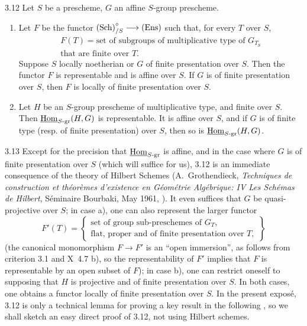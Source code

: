 \begin{proposition}{3.12}\label{XI.3.12}
Let $S$ be a prescheme, $G$ an affine $S$-group prescheme.
\begin{enumerate}[label=\alph*)]
\item Let $F$ be the functor $\textup{(Sch)}^\circ_{/S}\longrightarrow\textup{(Ens)}$ such that, for every $T$ over $S$,
\[
\begin{split}
F(T)=\text{set of subgroups of multiplicative type of }G_{T_S}\\
\text{that are finite over }T.
\end{split}
\]
Suppose $S$ locally noetherian or $G$ of finite presentation over $S$. Then the functor $F$ is representable and is affine over $S$. If $G$ is of finite presentation over $S$, then $F$ is locally of finite presentation over $S$.
\item Let $H$ be an $S$-group prescheme of multiplicative type, and finite over $S$. Then $\underline{\operatorname{Hom}}_{S\text{-gr}}(H,G)$ is representable. It is affine over $S$, and if $G$ is of finite type (resp. of finite presentation) over $S$, then so is $\underline{\operatorname{Hom}}_{S\text{-gr}}(H,G)$.
\end{enumerate}
\end{proposition}
\begin{remark}{3.13}\label{XI.3.13}
Except for the precision that $\underline{\operatorname{Hom}}_{S\text{-gr}}$ is affine, and in the case where $G$ is of finite presentation over $S$ (which will suffice for us), 3.12 is an immediate consequence of the theory of Hilbert Schemes (A.~Grothendieck, \textit{Techniques de construction et théorèmes d'existence en Géométrie Algébrique: IV Les Schémas de Hilbert}, Séminaire Bourbaki, May 1961, ). It even suffices that $G$ be quasi-projective over $S$; in case a), one can also represent the larger functor
\[
F'(T)=\left\{\begin{array}{l}
\text{set of group sub-preschemes of }G_T,\\
\text{flat, proper and of finite presentation over }T,
\end{array}\right\}
\]
(the canonical monomorphism $F\to F'$ is an ``open immersion'', as follows from criterion 3.1 and X~4.7 b), so the representability of $F'$ implies that $F$ is representable by an open subset of $F$); in case b), one can restrict oneself to supposing that $H$ is projective and of finite presentation over $S$. In both cases, one obtains a functor locally of finite presentation over $S$. In the present exposé, 3.12 is only a technical lemma for proving a key result in the following \No, so we shall sketch an easy direct proof of 3.12, not using Hilbert schemes.
\end{remark}

